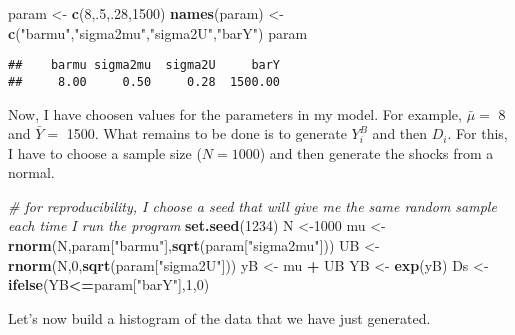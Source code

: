 \documentclass[]{book}
\newenvironment{Shaded}{\begin{snugshade}}{\end{snugshade}}
\newcommand{\CommentTok}[1]{\textcolor[rgb]{0.56,0.35,0.01}{\textit{#1}}}
\newcommand{\DecValTok}[1]{\textcolor[rgb]{0.00,0.00,0.81}{#1}}
\newcommand{\KeywordTok}[1]{\textcolor[rgb]{0.13,0.29,0.53}{\textbf{#1}}}
\newcommand{\NormalTok}[1]{#1}
\newcommand{\OperatorTok}[1]{\textcolor[rgb]{0.81,0.36,0.00}{\textbf{#1}}}
\newcommand{\StringTok}[1]{\textcolor[rgb]{0.31,0.60,0.02}{#1}}
\theoremstyle{definition}
\theoremstyle{definition}
\theoremstyle{definition}
\theoremstyle{remark}
\begin{document}
\begin{Shaded}
\begin{Highlighting}[]
\NormalTok{param <-}\StringTok{ }\KeywordTok{c}\NormalTok{(}\DecValTok{8}\NormalTok{,.}\DecValTok{5}\NormalTok{,.}\DecValTok{28}\NormalTok{,}\DecValTok{1500}\NormalTok{)}
\KeywordTok{names}\NormalTok{(param) <-}\StringTok{ }\KeywordTok{c}\NormalTok{(}\StringTok{"barmu"}\NormalTok{,}\StringTok{"sigma2mu"}\NormalTok{,}\StringTok{"sigma2U"}\NormalTok{,}\StringTok{"barY"}\NormalTok{)}
\NormalTok{param}
\end{Highlighting}
\end{Shaded}

\begin{verbatim}
##    barmu sigma2mu  sigma2U     barY 
##     8.00     0.50     0.28  1500.00
\end{verbatim}

Now, I have choosen values for the parameters in my model.
For example, \(\bar{\mu}=\) 8 and \(\bar{Y}=\) 1500.
What remains to be done is to generate \(Y_i^B\) and then \(D_i\).
For this, I have to choose a sample size (\(N=1000\)) and then generate the shocks from a normal.

\begin{Shaded}
\begin{Highlighting}[]
\CommentTok{# for reproducibility, I choose a seed that will give me the same random sample each time I run the program}
\KeywordTok{set.seed}\NormalTok{(}\DecValTok{1234}\NormalTok{)}
\NormalTok{N <-}\DecValTok{1000}
\NormalTok{mu <-}\StringTok{ }\KeywordTok{rnorm}\NormalTok{(N,param[}\StringTok{"barmu"}\NormalTok{],}\KeywordTok{sqrt}\NormalTok{(param[}\StringTok{"sigma2mu"}\NormalTok{]))}
\NormalTok{UB <-}\StringTok{ }\KeywordTok{rnorm}\NormalTok{(N,}\DecValTok{0}\NormalTok{,}\KeywordTok{sqrt}\NormalTok{(param[}\StringTok{"sigma2U"}\NormalTok{]))}
\NormalTok{yB <-}\StringTok{ }\NormalTok{mu }\OperatorTok{+}\StringTok{ }\NormalTok{UB }
\NormalTok{YB <-}\StringTok{ }\KeywordTok{exp}\NormalTok{(yB)}
\NormalTok{Ds <-}\StringTok{ }\KeywordTok{ifelse}\NormalTok{(YB}\OperatorTok{<=}\NormalTok{param[}\StringTok{"barY"}\NormalTok{],}\DecValTok{1}\NormalTok{,}\DecValTok{0}\NormalTok{) }
\end{Highlighting}
\end{Shaded}

Let's now build a histogram of the data that we have just generated.
\end{document}
